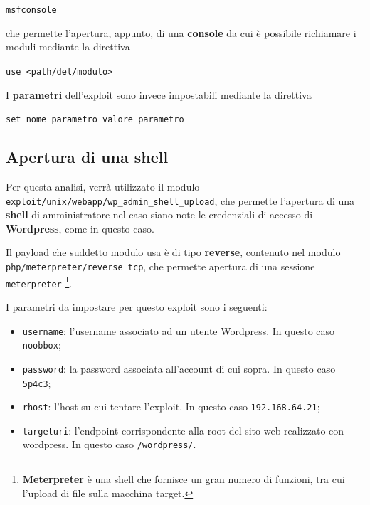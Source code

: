 \documentclass[a4paper, 12pt, oneside]{article}
\begin{document}
\begin{center}
    \texttt{msfconsole}
\end{center}

che permette l'apertura, appunto, di una \textbf{console} da cui è possibile richiamare i moduli mediante la direttiva

\begin{center}
    \texttt{use <path/del/modulo>}
\end{center}

I \textbf{parametri} dell'exploit sono invece impostabili mediante la direttiva

\begin{center}
    \texttt{set nome\_parametro valore\_parametro}
\end{center}

\subsection{Apertura di una shell}

Per questa analisi, verrà utilizzato il modulo \texttt{exploit/unix/webapp/wp\_admin\_shell\_upload}, che permette l'apertura di una \textbf{shell} di amministratore nel caso siano note le credenziali di accesso di \textbf{Wordpress}, come in questo caso.

Il payload che suddetto modulo usa è di tipo \textbf{reverse}, contenuto nel modulo \texttt{php/meterpreter/reverse\_tcp}, che permette apertura di una sessione \texttt{meterpreter} \footnote{\textbf{Meterpreter} è una shell che fornisce un gran numero di funzioni, tra cui l'upload di file sulla macchina target.\cite{meterpreter}}.

I parametri da impostare per questo exploit sono i seguenti:

\begin{itemize}
    \item \texttt{username}: l'username associato ad un utente Wordpress. In questo caso \texttt{noobbox};
    \item \texttt{password}: la password associata all'account di cui sopra. In questo caso \texttt{5p4c3};
    \item \texttt{rhost}: l'host su cui tentare l'exploit. In questo caso \texttt{192.168.64.21};
    \item \texttt{targeturi}: l'endpoint corrispondente alla root del sito web realizzato con wordpress. In questo caso \texttt{/wordpress/}.
\end{itemize}
\end{document}
